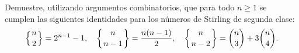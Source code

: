 Demuestre, utilizando argumentos combinatorios, que para todo \(n\ge1\) se cumplen las siguientes identidades para los números de Stirling de segunda clase:
\[
\left\{n\atop2\right\} = 2^{n-1}-1,
\quad
\left\{n\atop n-1\right\} = \frac{n(n-1)}2,
\quad
\left\{n\atop n-2\right\} = \binom n3 + 3\binom n4.
\]